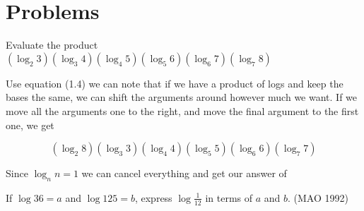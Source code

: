 \hfuzz=100pt 




\section{Problems}


\begin{question}
Evaluate the product $(\log_2{3})(\log_3{4})(\log_4{5})(\log_5{6})(\log_6{7})(\log_7{8})$
\end{question}

\begin{solution}

Use equation (1.4) we can note that if we have a product of logs and keep the bases the same, we can shift the arguments around however much we want. If we move all the arguments one to the right, and move the final argument to the first one, we get

$$(\log_2{8})(\log_3{3})(\log_4{4})(\log_5{5})(\log_6{6})(\log_7{7})$$

Since $\log_n{n} = 1$ we can cancel everything and get our answer of  
\end{solution}


\begin{question}
If $\log{36} = a$ and $\log{125} = b$, express $\log{\frac{1}{12}}$ in terms of \linebreak
$a$ and $b$. (MAO 1992)
\end{question}

